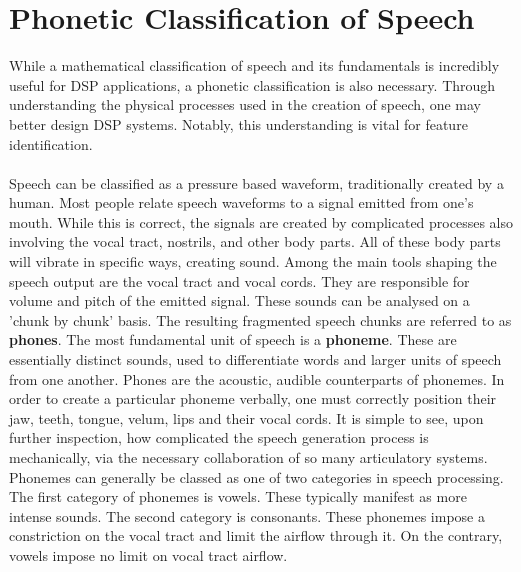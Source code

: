 \section{Phonetic Classification of Speech}
While a mathematical classification of speech and its fundamentals is incredibly useful for DSP applications, a phonetic classification is also necessary. Through understanding the physical processes used in the creation of speech, one may better design DSP systems. Notably, this understanding is vital for feature identification.
\\ \\
Speech can be classified as a pressure based waveform, traditionally created by a human. Most people relate speech waveforms to a signal emitted from one's mouth. While this is correct, the signals are created by complicated processes also involving the vocal tract, nostrils, and other body parts. All of these body parts will vibrate in specific ways, creating sound. Among the main tools shaping the speech output are the vocal tract and vocal cords. They are responsible for volume and pitch of the emitted signal. These sounds can be analysed on a 'chunk by chunk' basis. The resulting fragmented speech chunks are referred to as \textbf{phones}. The most fundamental unit of speech is a \textbf{phoneme}. These are essentially distinct sounds, used to differentiate words and larger units of speech from one another. Phones are the acoustic, audible counterparts of phonemes. In order to create a particular phoneme verbally, one must correctly position their jaw, teeth, tongue, velum, lips and their vocal cords. It is simple to see, upon further inspection, how complicated the speech generation process is mechanically, via the necessary collaboration of so many articulatory systems. Phonemes can generally be classed as one of two categories in speech processing. The first category of phonemes is vowels. These typically manifest as more intense sounds. The second category is consonants. These phonemes impose a constriction on the vocal tract and limit the airflow through it. On the contrary, vowels impose no limit on vocal tract airflow.

